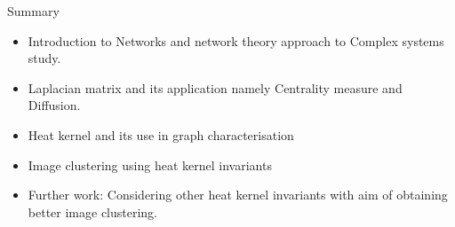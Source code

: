 \documentclass{beamer}
\begin{document}
%	


\begin{frame}{Summary}
	\begin{itemize}
		\item Introduction to Networks and network theory approach to Complex systems study.
		\item Laplacian matrix and its application namely Centrality measure and Diffusion.
		\item Heat kernel and its use in graph characterisation
		\item Image clustering using heat kernel invariants
		\item Further work: Considering other heat kernel invariants with aim of obtaining better image clustering.
	\end{itemize}
	
\end{frame}
\end{document}
